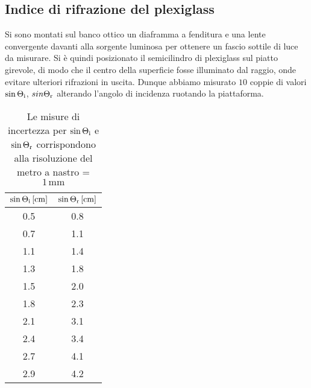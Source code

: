 \documentclass{article}[a4paper,11pt]
\begin{document}
\subsection*{Indice di rifrazione del plexiglass}
Si sono montati sul banco ottico un diaframma a fenditura e una lente convergente davanti alla sorgente luminosa per ottenere un fascio sottile di luce da misurare. Si \`e quindi posizionato il semicilindro di plexiglass sul piatto girevole, di modo che il centro della superficie fosse illuminato dal raggio, onde evitare ulteriori rifrazioni in uscita. Dunque abbiamo misurato $10$ coppie di valori $\sin\Theta_{\rm i}$, $sin\Theta_{\rm r}$ alterando l'angolo di incidenza ruotando la piattaforma.

\begin{table}[H]
  \begin{center}
	\begin{tabular}{cc}
	\toprule
	$\sin\Theta_{\rm i} \, [\si{\cm}]$ & $\sin\Theta_{\rm r} \, [\si{\cm}]$ \\
	\midrule
	\midrule
	0.5	&	0.8	\\
	0.7	&	1.1	\\
	1.1	&	1.4	\\
	1.3	&	1.8	\\
	1.5	&	2.0	\\	
	1.8	&	2.3 \\		
	2.1	&	3.1	\\	
	2.4	&	3.4	\\	
	2.7	&	4.1	\\	
	2.9	&	4.2 \\
	\bottomrule
	\end{tabular}
  \end{center}
  \caption{Le misure di incertezza per $\sin\Theta_{\rm i}$ e $\sin\Theta_{\rm r}$ corrispondono alla risoluzione del metro a nastro =  $1 \, \si{\mm}$ \label{tab:plex}}
\end{table}
\end{document}
